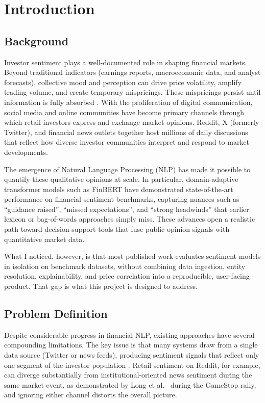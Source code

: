 \chapter{Introduction}
\label{chap:introduction}

\section{Background}

Investor sentiment plays a well-documented role in shaping financial markets.
Beyond traditional indicators (earnings reports, macroeconomic data, and analyst
forecasts), collective mood and perception can drive price volatility, amplify
trading volume, and create temporary mispricings. These mispricings persist
until information is fully absorbed \citep{tetlock2007giving}. With the
proliferation of digital communication, social media and online communities
have become primary channels through which retail investors express and
exchange market opinions. Reddit,
X (formerly Twitter), and financial news outlets together host millions of daily
discussions that reflect how diverse investor communities interpret and respond to
market developments.

The emergence of Natural Language Processing (NLP) has made it possible to
quantify these qualitative opinions at scale. In particular, domain-adaptive
transformer models such as FinBERT \citep{araci2019finbert} have demonstrated
state-of-the-art performance on financial sentiment benchmarks, capturing nuances
such as ``guidance raised'', ``missed expectations'', and ``strong headwinds'' that
earlier lexicon or bag-of-words approaches simply miss. These advances open a
realistic path toward decision-support tools that fuse public opinion signals
with quantitative market data.

What I noticed, however, is that most published work evaluates sentiment models
in isolation on benchmark datasets, without combining data ingestion, entity
resolution, explainability, and price correlation into a reproducible, user-facing
product. That gap is what this project is designed to address.

\section{Problem Definition}

Despite considerable progress in financial NLP, existing approaches have several
compounding limitations. The key issue is that many systems draw from a single
data source (Twitter or news feeds), producing sentiment signals that reflect
only one segment of the investor population \citep{tetlock2007giving,
bollen2011twitter}. Retail sentiment on Reddit, for example, can diverge
substantially from institutional-oriented news sentiment during the same market
event, as demonstrated by Long et al.\ \citep{long2023reddit} during the
GameStop rally, and ignoring either channel distorts the overall picture.

